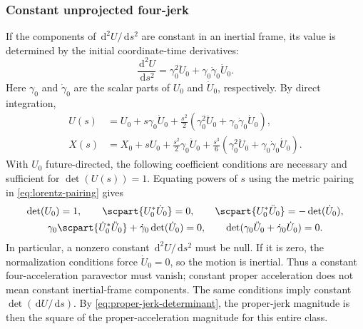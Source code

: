 \documentclass[11pt]{article}
\newcommand{\pv}[1]{{#1}}
\newcommand{\pU}{\pv{U}}
\newcommand{\pX}{\pv{X}}
\numberwithin{equation}{section}
\newcommand{\dd}{\,\mathrm d}
\begin{document}
\subsubsection{Constant unprojected four-jerk}
If the components of $\dd^2\pU/\dd s^2$ are constant in an inertial frame,
its value is determined by the initial coordinate-time derivatives:
\[
 \frac{\dd^2\pU}{\dd s^2}
 =\gamma_0^2\ddot{\pU}_0+\gamma_0\dot{\gamma}_0\dot{\pU}_0.
\]
Here $\gamma_0$ and $\dot{\gamma}_0$ are the scalar parts of
$\pU_0$ and $\dot{\pU}_0$, respectively.
By direct integration,
\begin{align*}
 \pU(s)&=\pU_0+s\gamma_0\dot{\pU}_0
 +\frac{s^2}{2}(\gamma_0^2\ddot{\pU}_0
                   +\gamma_0\dot{\gamma}_0\dot{\pU}_0),\\
 \pX(s)&=\pX_0+s\pU_0+\frac{s^2}{2}\gamma_0\dot{\pU}_0
 +\frac{s^3}{6}(\gamma_0^2\ddot{\pU}_0
                   +\gamma_0\dot{\gamma}_0\dot{\pU}_0).
\end{align*}
With $\pU_0$ future-directed, the following coefficient conditions
are necessary and sufficient for $\det(\pU(s))=1$. Equating powers of $s$
using the metric pairing in \eqref{eq:lorentz-pairing} gives
\begin{gather*}
 \det(\pU_0)=1,\qquad \scpart{\pU_0^*\dot{\pU}_0}=0,\qquad
 \scpart{\pU_0^*\ddot{\pU}_0}=-\det(\dot{\pU}_0),\\
 \gamma_0\scpart{\dot{\pU}_0^*\ddot{\pU}_0}
 +\dot{\gamma}_0\det(\dot{\pU}_0)=0,\qquad
 \det(\gamma_0\ddot{\pU}_0+\dot{\gamma}_0\dot{\pU}_0)=0.
\end{gather*}
In particular, a nonzero constant $\dd^2\pU/\dd s^2$ must be null.
If it is zero, the normalization conditions force $\dot{\pU}_0=0$,
so the motion is inertial.
Thus a constant four-acceleration paravector must vanish; constant proper
acceleration does not mean constant inertial-frame components.
The same conditions imply constant $\det(\dd\pU/\dd s)$.
By \eqref{eq:proper-jerk-determinant}, the proper-jerk magnitude is then
the square of the proper-acceleration magnitude for this entire class.
\end{document}
